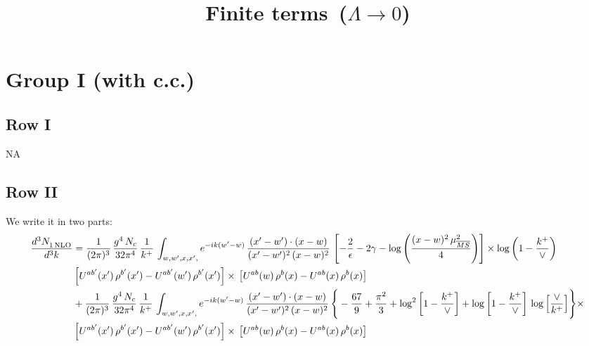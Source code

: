 \documentclass[9pt]{article}
\title{Finite terms\, ($\Lambda\to 0$)}
\author{}
\date{}
\numberwithin{equation}{section}
\begin{document}
\maketitle
\section{Group I (with c.c.)}
\subsection{Row I}
\textsc{NA}
\subsection{Row II}
We write it in two parts:
\begin{align}
     \frac{d^{3}N_{1\,\rm NLO}^{\rm}}{d^{3}k} &  =  \frac{1}{(2\pi)^{3}}\, \frac{g^{4}\,N_{c}}{32\pi^{4}}\,\frac{1}{k^{+}}\, \int_{w, w',x,x',} e^{-ik(w^\prime-w)}\, \frac{(x'-w')\cdot (x-w)}{(x'-w')^{2}\, (x-w)^{2}}\, \left[-\frac{2}{\epsilon}-2\gamma-\log{\left(\frac{(x-w)^{2}\,\mu^{2}_{\overline{MS}}}{4}\right)}\right]\times\log{\left(1-\frac{k^{+}}{\vee}\right)}\notag \\ & \left[U^{ab'}(x')\,\rho^{b'}(x') - U^{ab'}(w')\,\rho^{b'}(x')\right]\times\,\left[U^{ab}(w)\,\rho^{b}(x) - U^{ab}(x)\,\rho^{b}(x)\right]\notag \\ & +\frac{1}{(2\pi)^{3}}\, \frac{g^{4}\,N_{c}}{32\pi^{4}}\,\frac{1}{k^{+}}\, \int_{w, w',x,x',} e^{-ik(w^\prime-w)}\, \frac{(x'-w')\cdot (x-w)}{(x'-w')^{2}\, (x-w)^{2}}\, \Bigg\{ -\frac{67}{9}+\frac{\pi^{2}}{3}+\log^{2}{\left[1-\frac{k^{+}}{\vee}\right]}+\log{\left[1-\frac{k^{+}}{\vee}\right]}\,\log{\left[\frac{\vee}{k^{+}}\right]}\Bigg\}\times\notag \\ & \left[U^{ab'}(x')\,\rho^{b'}(x') - U^{ab'}(w')\,\rho^{b'}(x')\right]\times\,\left[U^{ab}(w)\,\rho^{b}(x) - U^{ab}(x)\,\rho^{b}(x)\right]
\end{align}  
\end{document}
